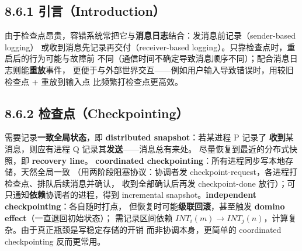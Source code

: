 \subsection*{8.6.1 引言（Introduction）}
由于检查点昂贵，容错系统常把它与\textbf{消息日志}结合：发消息前记录（sender-based logging）
或收到消息先记录再交付（receiver-based logging）。只靠检查点时，重启后的行为可能与故障前
不同（通信时间不确定导致消息顺序不同）；配合消息日志则能\textbf{重放}事件，
更便于与外部世界交互——例如用户输入导致错误时，用较旧检查点 + 重放到输入点
比频繁打检查点更高效。

\begin{closeread}
\end{closeread}


\subsection*{8.6.2 检查点（Checkpointing）}
需要记录\textbf{一致全局状态}，即 \textbf{distributed snapshot}：若某进程 P 记录了
\textbf{收到}某消息，则应有进程 Q 记录其\textbf{发送}——消息总有来处。
尽量恢复到最近的分布式快照，即 \textbf{recovery line}。
\textbf{coordinated checkpointing}：所有进程同步写本地存储，天然全局一致
（用两阶段阻塞协议：协调者发 checkpoint-request，各进程打检查点、排队后续消息并确认，
收到全部确认后再发 checkpoint-done 放行）；可只通知\textbf{依赖}协调者的进程，得到
incremental snapshot。\textbf{independent checkpointing}：各自随时打点，
但恢复时可能\textbf{级联回滚}，甚至触发 \textbf{domino effect}（一直退回初始状态）；
需记录区间依赖 $INT_i(m) \to INT_j(n)$，计算复杂。由于真正瓶颈是写稳定存储的开销
而非协调本身，更简单的 coordinated checkpointing 反而更常用。

\begin{closeread}
\end{closeread}


